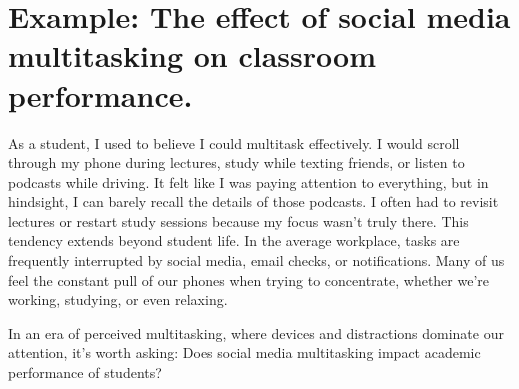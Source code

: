 \documentclass[
  letterpaper,
  DIV=11,
  numbers=noendperiod,
  oneside]{scrreprt}
\begin{document}
\section{Example: The effect of social media multitasking on classroom
performance.}\label{example-the-effect-of-social-media-multitasking-on-classroom-performance.}

As a student, I used to believe I could multitask effectively. I would
scroll through my phone during lectures, study while texting friends, or
listen to podcasts while driving. It felt like I was paying attention to
everything, but in hindsight, I can barely recall the details of those
podcasts. I often had to revisit lectures or restart study sessions
because my focus wasn't truly there. This tendency extends beyond
student life. In the average workplace, tasks are frequently interrupted
by social media, email checks, or notifications. Many of us feel the
constant pull of our phones when trying to concentrate, whether we're
working, studying, or even relaxing.

In an era of perceived multitasking, where devices and distractions
dominate our attention, it's worth asking: Does social media
multitasking impact academic performance of students?
\end{document}
